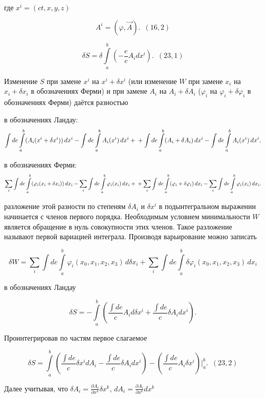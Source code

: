 \documentclass[11pt]{article}
\begin{document}
где \(x^i = \left(ct, x, y, z\right)\)

\[A^i=\left(\varphi, \vec A\right).\,\,\, (16,2)\]

    \[\delta S = \delta \int\limits_{a}^{b} \left(-\frac{e}{c}A_i d x^i\right).\,\,\,  (23,1)\]

    Изменение \(S\) при замене \(x^i\) на \(x^i + \delta x^i\) (или
изменение \(W\) при замене \(x_i\) на \(x_i + \delta x_i\) в
обозначениях Ферми) и при замене \(A_i\) на \(A_i + \delta A_i\)
(\(\varphi_i\) на \(\varphi_i + \delta \varphi_i\) в обозначениях Ферми)
даётся разностью

в обозначениях Ландау: \[
\int de \int\limits_{a}^{b} (A_i(x^i + \delta x^i)) \, dx^i - \int de \int\limits_{a}^{b} A_i(x^i) \, dx^i
+\\+
\int de \int\limits_{a}^{b} (A_i + \delta A_i) \, dx^i - \int de \int\limits_{a}^{b} A_i(x^i) \, dx^i
.
\]

в обозначениях Ферми: \[
\sum_i\int de \int\limits_{a}^{b} (\varphi_i(x_i + \delta x_i)) \, dx_i - \sum_i\int de \int\limits_{a}^{b} \varphi_i(x_i) \, dx_i
+\\+
\sum_i\int de \int\limits_{a}^{b} (\varphi_i + \delta \varphi_i) \, dx_i - \sum_i\int de \int\limits_{a}^{b} \varphi_i(x_i) \, dx_i
.
\]

разложение этой разности по степеням \(\delta A_i\) и \(\delta x^i\) в
подынтегральном выражении начинается с членов первого порядка.
Необходимым условием минимальности \(W\) является обращение в нуль
совокупности этих членов. Такое разложение называют первой вариацией
интеграла. Производя варьирование можно записать

\[\delta W =  \sum\limits_i \int de \int\limits_{a}^{b}  \varphi_i(x_0, x_1, x_2, x_3) \,d \delta x_i + \sum\limits_i \int de \int\limits_{a}^{b} \delta \varphi_i(x_0, x_1, x_2, x_3) \,d x_i\]

    в обозначениях Ландау

\[\delta S = - \int\limits_{a}^{b} \left(\frac{\int de}{c}A_i d \delta x^i + \frac{\int de}{c}\delta A_i d x^i\right).\]

    Проинтегрировав по частям первое слагаемое

\[\delta S = \int\limits_{a}^{b} \left(\frac{\int de}{c} \delta x^i d A_i - \frac{\int de}{c}\delta A_i d x^i\right) -  \left(\frac{\int de}{c}A_i \delta x^i \right) \Bigg|_{a}^{b}.\,\,\,  (23,2)\]

    Далее учитывая, что
\(\delta A_i = \frac{\partial A_i}{\partial x^k} \delta x^k\),
\(d A_i = \frac{\partial A_i}{\partial x^k} d x^k\)
\end{document}
